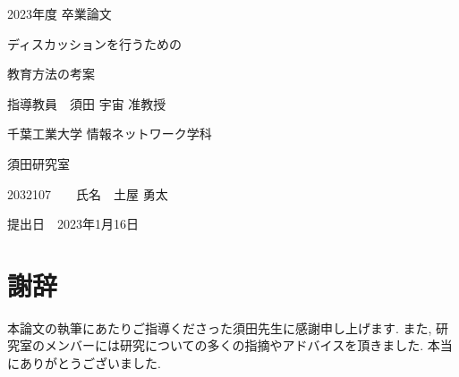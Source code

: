 \documentclass[12pt,a4j,titlepage]{ltjsarticle}
\begin{document}
\begin{titlepage}
    \begin{center}
    
        \vspace*{20truept}

        {\LARGE 2023年度  卒業論文}

        \vspace*{75truept}

        {\Huge ディスカッションを行うための}
        \vspace{10truept}
        
        {\Huge 教育方法の考案} 

        \vspace{85truept}

        {\LARGE 指導教員　須田 宇宙 准教授}

        \vspace{60truept}

        {\LARGE 千葉工業大学 情報ネットワーク学科}

        \vspace{15truept}

        {\LARGE 須田研究室}

        \vspace{70truept}

        {\LARGE 2032107　　氏名　土屋 勇太}
        
        \vspace{70truept}
        
    \end{center}
    \begin{flushright}
    
        {\LARGE 提出日　2023年1月16日}
        
    \end{flushright}
\end{titlepage}

\setcounter{tocdepth}{3}
\tableofcontents
\clearpage


\clearpage


\clearpage


\section*{謝辞}
本論文の執筆にあたりご指導くださった須田先生に感謝申し上げます. 
また, 研究室のメンバーには研究についての多くの指摘やアドバイスを頂きました. 
本当にありがとうございました. 
\clearpage
\end{document}
